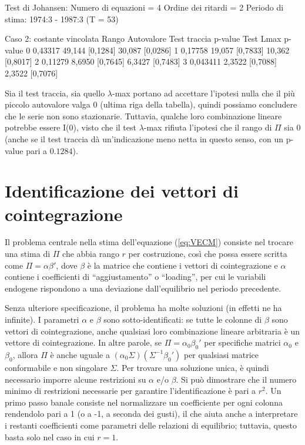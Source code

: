 \begin{center}
\begin{code}
Test di Johansen:
Numero di equazioni = 4
Ordine dei ritardi = 2
Periodo di stima: 1974:3 - 1987:3 (T = 53)

Caso 2: costante vincolata
Rango Autovalore Test traccia p-value   Test Lmax  p-value
   0    0,43317     49,144 [0,1284]     30,087 [0,0286]
   1    0,17758     19,057 [0,7833]     10,362 [0,8017]
   2    0,11279     8,6950 [0,7645]     6,3427 [0,7483]
   3   0,043411     2,3522 [0,7088]     2,3522 [0,7076]
\end{code}
\end{center}

Sia il test traccia, sia quello $\lambda$-max portano ad accettare l'ipotesi nulla
che il più piccolo autovalore valga 0 (ultima riga della tabella), quindi possiamo
concludere che le serie non sono stazionarie. Tuttavia, qualche loro combinazione
lineare potrebbe essere I(0), visto che il test $\lambda$-max rifiuta l'ipotesi che
il rango di $\Pi$ sia 0 (anche se il test traccia dà un'indicazione meno netta
in questo senso, con un p-value pari a $0.1284$).

\section{Identificazione dei vettori di cointegrazione}
\label{sec:johansen-ident}

Il problema centrale nella stima dell'equazione (\ref{eq:VECM}) consiste nel
trocare una stima di $\Pi$ che abbia rango $r$ per costruzione, così che possa
essere scritta come $\Pi = \alpha \beta'$, dove $\beta$ è la matrice che
contiene i vettori di cointegrazione e $\alpha$ contiene i coefficienti di
``aggiustamento'' o ``loading'', per cui le variabili endogene rispondono
a una deviazione dall'equilibrio nel periodo precedente.

Senza ulteriore specificazione, il problema ha molte soluzioni (in effetti
ne ha infinite). I parametri $\alpha$ e $\beta$ sono sotto-identificati: se
tutte le colonne di $\beta$ sono vettori di cointegrazione, anche qualsiasi loro
combinazione lineare arbitraria è un vettore di cointegrazione. In altre parole,
se $\Pi = \alpha_0 \beta_0'$ per specifiche matrici $\alpha_0$ e $\beta_0$, allora
$\Pi$ è anche uguale a $(\alpha_0 \Sigma)(\Sigma^{-1} \beta_0')$ per qualsiasi
matrice conformabile e non singolare $\Sigma$. Per trovare una soluzione unica,
è quindi necessario imporre alcune restrizioni su $\alpha$ e/o
$\beta$. Si può dimostrare che il numero minimo di restrizioni necessarie per
garantire l'identificazione è pari a $r^2$. Un primo passo banale consiste nel
normalizzare un coefficiente per ogni colonna rendendolo pari a 1 (o a -1, a
seconda dei gusti), il che aiuta anche a interpretare i restanti coefficienti
come parametri delle relazioni di equilibrio; tuttavia, questo basta solo nel
caso in cui $r=1$.

